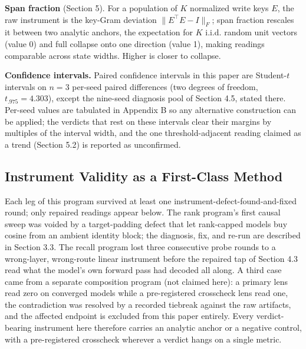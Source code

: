 \textbf{Span fraction} (Section 5). For a population of $K$ normalized write
keys $E$, the raw instrument is the key-Gram deviation
$\lVert E^{\top}E - I \rVert_F$; span fraction rescales it between two
analytic anchors, the expectation for $K$ i.i.d. random unit vectors
(value 0) and full collapse onto one direction (value 1), making readings comparable across state widths.
Higher is closer to collapse.

\textbf{Confidence intervals.} Paired confidence intervals in this paper
are Student-$t$ intervals on $n{=}3$ per-seed paired differences (two
degrees of freedom, $t_{.975} = 4.303$), except
the nine-seed diagnosis pool of Section 4.5, stated there. Per-seed
values are tabulated in Appendix B so any alternative construction can
be applied; the verdicts that rest on these intervals clear their
margins by multiples of the interval width, and the one
threshold-adjacent reading claimed as a trend (Section 5.2) is reported
as unconfirmed.

\subsection{Instrument Validity as a First-Class Method}

Each leg of this program survived at least one
instrument-defect-found-and-fixed round; only repaired readings appear
below. The rank program's first causal sweep was voided by a
target-padding defect that let rank-capped models buy cosine from an
ambient identity block; the diagnosis, fix, and re-run are described
in Section 3.3. The recall program lost three consecutive probe rounds
to a wrong-layer, wrong-route linear instrument before the repaired
tap of Section 4.3 read what the model's own forward pass had decoded
all along. A third case came from a separate composition program (not
claimed here): a primary lens read zero on converged models while a
pre-registered crosscheck lens read one, the contradiction was
resolved by a recorded tiebreak against the raw artifacts, and the
affected endpoint is excluded from this paper entirely. Every verdict-bearing instrument here therefore carries an analytic
anchor or a negative control, with a pre-registered crosscheck wherever
a verdict hangs on a single metric.

